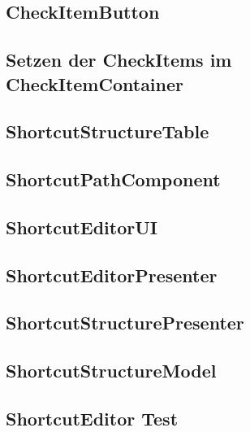\subsection{CheckItemButton}
\label{CheckItemButton}


\subsection{Setzen der CheckItems im CheckItemContainer}
\label{CheckItemContainer}


\subsection{ShortcutStructureTable}
\label{ShortcutStructureTable}


\subsection{ShortcutPathComponent}
\label{ShortcutPathComponent}


\subsection{ShortcutEditorUI}
\label{ShortcutEditorUI}


\subsection{ShortcutEditorPresenter}
\label{ShortcutEditorPresenter}


\subsection{ShortcutStructurePresenter}
\label{ShortcutStructurePresenter}



\subsection{ShortcutStructureModel}
\label{ShortcutStructureModel}


\subsection{ShortcutEditor Test}
\label{Test_ShortcutEditor}

